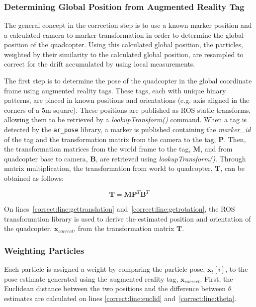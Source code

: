 \begin{spacing}{2.0}
\begin{algorithm}
\begin{algorithmic}[1]
				\\
				\\
				\\
				\EndFunction
			\end{algorithmic}
		\end{algorithm}
		\end{spacing}

		\subsubsection{Determining Global Position from Augmented Reality Tag}
			The general concept in the correction step is to use a known marker position and a calculated camera-to-marker transformation in order to determine the global position of the quadcopter. Using this calculated global position, the particles, weighted by their similarity to the calculated global position, are resampled to correct for the drift accumulated by using local measurements.

			The first step is to determine the pose of the quadcopter in the global coordinate frame using augmented reality tags. These tags, each with unique binary patterns, are placed in known positions and orientations (e.g. axis aligned in the corners of a 5m square). These positions are published as ROS static transforms, allowing them to be retrieved by a \textit{lookupTransform()} command. When a tag is detected by the \texttt{ar\_pose} library, a marker is published containing the \textit{marker\_id} of the tag and the transformation matrix from the camera to the tag, $\textbf{P}$. Then, the transformation matrices from the world frame to the tag, $\textbf{M}$,  and from quadcopter base to camera, $\textbf{B}$, are retrieved using \textit{lookupTransform()}. Through matrix multiplication, the transformation from world to quadcopter, $\textbf{T}$, can be obtained as follows:

			\[\textbf{T} = \textbf{M}\textbf{P}^T\textbf{B}^T \]

			On lines~\ref{correct:line:gettranslation} and~\ref{correct:line:getrotation}, the ROS transformation library is used to derive the estimated position and orientation of the quadcopter, $\textbf{x}_{correct}$, from the transformation matrix $\textbf{T}$.

		\subsubsection{Weighting Particles}
			Each particle is assigned a weight by comparing the particle pose, $\textbf{x}_t[i]$, to the pose estimate generated using the augmented reality tag, $\textbf{x}_{correct}$. First, the Euclidean distance between the two positions and the difference between $\theta$ estimates are calculated on lines \ref{correct:line:euclid} and~\ref{correct:line:theta}.

